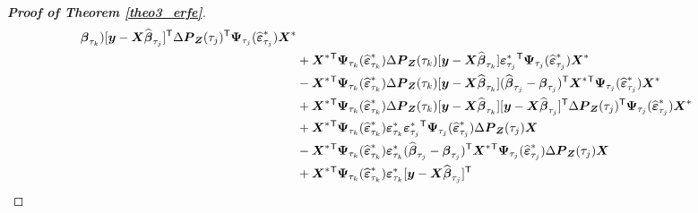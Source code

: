 \documentclass[15pt,a4paper]{article}
\newcommand{\transpose}{{}^{\text{\sffamily T}}}
\begin{document}
\begin{proof}[\textbf{Proof of Theorem \ref{theo3_erfe}}]
\begin{equation*}
\begin{split}
    \boldsymbol{\beta}_{\tau_{k}})[\boldsymbol{y}-\boldsymbol{X}\widehat{\boldsymbol{\beta}}_{\tau_{j}}]\transpose\Delta\boldsymbol{P}_{\boldsymbol{Z}}(\tau_{j})\transpose\boldsymbol{\Psi}_{\tau_j}
    (\widehat{\boldsymbol{\varepsilon}}^{*}_{\tau_j})\boldsymbol{X}^{*}\\
& + \boldsymbol{X}^{*}\transpose\boldsymbol{\Psi}_{\tau_k}(\widehat{\boldsymbol{\varepsilon}}^{*}_{\tau_k})\Delta\boldsymbol{P}_{\boldsymbol{Z}}(\tau_{k})[\boldsymbol{y}-\boldsymbol{X}\widehat{\boldsymbol{\beta}}_{\tau_{k}}]
    \boldsymbol{\varepsilon}^{*}_{\tau_{j}}\transpose\boldsymbol{\Psi}_{\tau_j}(\widehat{\boldsymbol{\varepsilon}}^{*}_{\tau_j})\boldsymbol{X}^{*}\\
& - \boldsymbol{X}^{*}\transpose\boldsymbol{\Psi}_{\tau_k}(\widehat{\boldsymbol{\varepsilon}}^{*}_{\tau_k})\Delta\boldsymbol{P}_{\boldsymbol{Z}}(\tau_{k})[\boldsymbol{y}-\boldsymbol{X}\widehat{\boldsymbol{\beta}}_{\tau_{k}}]
    (\widehat{\boldsymbol{\beta}}_{\tau_{j}} - \boldsymbol{\beta}_{\tau_{j}})\transpose\boldsymbol{X}^{*}\transpose\boldsymbol{\Psi}_{\tau_j}(\widehat{\boldsymbol{\varepsilon}}^{*}_{\tau_j})\boldsymbol{X}^{*}\\
& + \boldsymbol{X}^{*}\transpose\boldsymbol{\Psi}_{\tau_k}(\widehat{\boldsymbol{\varepsilon}}^{*}_{\tau_k})\Delta\boldsymbol{P}_{\boldsymbol{Z}}(\tau_{k})[\boldsymbol{y}-\boldsymbol{X}\widehat{\boldsymbol{\beta}}_{\tau_{k}}]
    [\boldsymbol{y}-\boldsymbol{X}\widehat{\boldsymbol{\beta}}_{\tau_{j}}]\transpose\Delta\boldsymbol{P}_{\boldsymbol{Z}}(\tau_{j})\transpose\boldsymbol{\Psi}_{\tau_j}(\widehat{\boldsymbol{\varepsilon}}^{*}_{\tau_j})\boldsymbol{X}^{*}\\
& + \boldsymbol{X}^{*}\transpose\boldsymbol{\Psi}_{\tau_k}(\widehat{\boldsymbol{\varepsilon}}^{*}_{\tau_k})\boldsymbol{\varepsilon}^{*}_{\tau_{k}}\boldsymbol{\varepsilon}^{*}_{\tau_{j}}\transpose\boldsymbol{\Psi}_{\tau_j}(\widehat{\boldsymbol{\varepsilon}}^{*}_{\tau_j})
        \Delta\boldsymbol{P}_{\boldsymbol{Z}}(\tau_j)\boldsymbol{X} \\
& - \boldsymbol{X}^{*}\transpose\boldsymbol{\Psi}_{\tau_k}(\widehat{\boldsymbol{\varepsilon}}^{*}_{\tau_k})\boldsymbol{\varepsilon}^{*}_{\tau_{k}}(\widehat{\boldsymbol{\beta}}_{\tau_{j}} - \boldsymbol{\beta}_{\tau_{j}})\transpose   
       \boldsymbol{X}^{*}\transpose\boldsymbol{\Psi}_{\tau_j}(\widehat{\boldsymbol{\varepsilon}}^{*}_{\tau_j})\Delta\boldsymbol{P}_{\boldsymbol{Z}}(\tau_j)\boldsymbol{X}\\
& + \boldsymbol{X}^{*}\transpose\boldsymbol{\Psi}_{\tau_k}(\widehat{\boldsymbol{\varepsilon}}^{*}_{\tau_k})\boldsymbol{\varepsilon}^{*}_{\tau_{k}}[\boldsymbol{y}-\boldsymbol{X}\widehat{\boldsymbol{\beta}}_{\tau_{j}}]\transpose

\end{split}
\end{equation*}
\end{proof}
\end{document}
